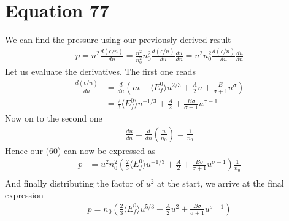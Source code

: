 \documentclass{article}
\newcommand{\la}{\langle}
\newcommand{\ra}{\rangle}
\begin{document}
 \section*{Equation 77}
 We can find the pressure using our previously derived result 
 \begin{align}
    p=n^2\frac{d(\epsilon/n)}{dn}=\frac{n^2}{n_0^2}n_0^2 \frac{d(\epsilon/n)}{du}\frac{du}{dn}=u^2n_0^2\frac{d(\epsilon/n)}{du}\frac{du}{dn}
 \end{align}
 Let us evaluate the derivatives. The first one reads
 \begin{align}
    \frac{d(\epsilon/n)}{du}&=\frac{d}{du}(m+\la E_f^0\ra u^{2/3}+\frac{A}{2}u+\frac{B}{\sigma+1}u^{\sigma})\\ 
    &=\frac{2}{3}\la E_f^0\ra u^{-1/3}+\frac{A}{2}+\frac{B\sigma}{\sigma+1}u^{\sigma-1}
 \end{align}
 Now on to the second one 
 \begin{align}
    \frac{du}{dn}=\frac{d}{dn}(\frac{n}{n_0})=\frac{1}{n_0}
 \end{align}
 Hence our (60) can now be expressed as 
 \begin{align}
    p&=u^2n_0^2(\frac{2}{3}\la E_f^0\ra u^{-1/3}+\frac{A}{2}+\frac{B\sigma}{\sigma+1}u^{\sigma-1})\frac{1}{n_0}\\ 
 \end{align}
 And finally distributing the factor of $u^2$ at the start, we arrive at the final expression 
 \begin{align}
    \boxed{p=n_0(\frac{2}{3}\la E_f^0\ra u^{5/3}+\frac{A}{2}u^2+\frac{B\sigma}{\sigma+1}u^{\sigma+1})}
 \end{align}
\end{document}
